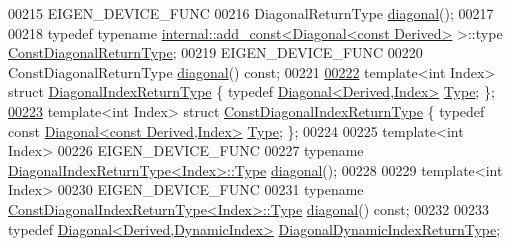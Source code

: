 \begin{DoxyCode}
00215     EIGEN\_DEVICE\_FUNC
00216     DiagonalReturnType \hyperlink{group___core___module_ab5768147536273eb2dbdfa389cfd26a3}{diagonal}();
00217 
00218     \textcolor{keyword}{typedef} \textcolor{keyword}{typename} \hyperlink{struct_eigen_1_1internal_1_1add__const}{internal::add\_const<Diagonal<const Derived>}
       >::type \hyperlink{group___core___module_class_eigen_1_1_transpose}{ConstDiagonalReturnType};
00219     EIGEN\_DEVICE\_FUNC
00220     ConstDiagonalReturnType \hyperlink{group___core___module_ab5768147536273eb2dbdfa389cfd26a3}{diagonal}() \textcolor{keyword}{const};
00221 
\hyperlink{struct_eigen_1_1_matrix_base_1_1_diagonal_index_return_type}{00222}     \textcolor{keyword}{template}<\textcolor{keywordtype}{int} Index> \textcolor{keyword}{struct }\hyperlink{struct_eigen_1_1_matrix_base_1_1_diagonal_index_return_type}{DiagonalIndexReturnType} \{ \textcolor{keyword}{typedef} 
      \hyperlink{group___core___module_class_eigen_1_1_diagonal}{Diagonal<Derived,Index>} \hyperlink{group___core___module_class_eigen_1_1_diagonal}{Type}; \};
\hyperlink{struct_eigen_1_1_matrix_base_1_1_const_diagonal_index_return_type}{00223}     \textcolor{keyword}{template}<\textcolor{keywordtype}{int} Index> \textcolor{keyword}{struct }\hyperlink{struct_eigen_1_1_matrix_base_1_1_const_diagonal_index_return_type}{ConstDiagonalIndexReturnType} \{ \textcolor{keyword}{typedef} \textcolor{keyword}{const} 
      \hyperlink{group___core___module_class_eigen_1_1_diagonal}{Diagonal<const Derived,Index>} \hyperlink{group___core___module_class_eigen_1_1_diagonal}{Type}; \};
00224 
00225     \textcolor{keyword}{template}<\textcolor{keywordtype}{int} Index>
00226     EIGEN\_DEVICE\_FUNC
00227     \textcolor{keyword}{typename} \hyperlink{group___core___module_class_eigen_1_1_diagonal}{DiagonalIndexReturnType<Index>::Type} 
      \hyperlink{group___core___module_ab5768147536273eb2dbdfa389cfd26a3}{diagonal}();
00228 
00229     \textcolor{keyword}{template}<\textcolor{keywordtype}{int} Index>
00230     EIGEN\_DEVICE\_FUNC
00231     \textcolor{keyword}{typename} \hyperlink{group___core___module_class_eigen_1_1_diagonal}{ConstDiagonalIndexReturnType<Index>::Type} 
      \hyperlink{group___core___module_ab5768147536273eb2dbdfa389cfd26a3}{diagonal}() \textcolor{keyword}{const};
00232 
00233     \textcolor{keyword}{typedef} \hyperlink{group___core___module_class_eigen_1_1_diagonal}{Diagonal<Derived,DynamicIndex>} 
      \hyperlink{group___core___module_class_eigen_1_1_diagonal}{DiagonalDynamicIndexReturnType};

\end{DoxyCode}
